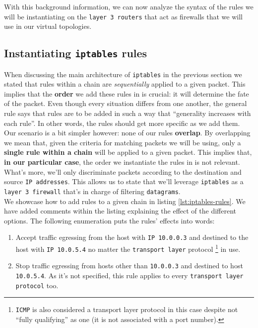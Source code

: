             With this background information, we can now analyze the syntax of the rules we will be instantiating on the \texttt{layer 3 routers} that act as firewalls that we will use in our virtual topologies.\\

        \subsection{Instantiating \texttt{iptables} rules}
            When discussing the main architecture of \texttt{iptables} in the previous section we stated that rules within a chain are \textit{sequentially} applied to a given packet. This implies that the \textbf{order} we add these rules in is crucial: it will determine the fate of the packet. Even though every situation differs from one another, the general rule says that rules are to be added in such a way that ``generality increases with each rule''. In other words, the rules should get more specific as we add them.\\

            Our scenario is a bit simpler however: none of our rules \textbf{overlap}. By overlapping we mean that, given the criteria for matching packets we will be using, only a \textbf{single rule within a chain} will be applied to a given packet. This implies that, \textbf{in our particular case}, the order we instantiate the rules in is not relevant. What's more, we'll only discriminate packets according to the destination and source \texttt{IP addresses}. This allows us to state that we'll leverage \texttt{iptables} as a \texttt{layer 3 firewall} that's in charge of filtering \texttt{datagrams}.\\

            We showcase how to add rules to a given chain in listing \ref{lst:iptables-rules}. We have added comments within the listing explaining the effect of the different options. The following enumeration puts the rules' effects into words:\\

            \begin{enumerate}
                \item Accept traffic egressing from the host with \texttt{IP 10.0.0.3} and destined to the host with \texttt{IP 10.0.5.4} no matter the \texttt{transport layer} protocol \footnote{\texttt{ICMP} is also considered a transport layer protocol in this case despite not ``fully qualifying'' as one (it is not associated with a port number).} in use.
                \item Stop traffic egressing from hosts other than \texttt{10.0.0.3} and destined to host \texttt{10.0.5.4}. As it's not specified, this rule applies to every \texttt{transport layer protocol} too.
            \end{enumerate}

